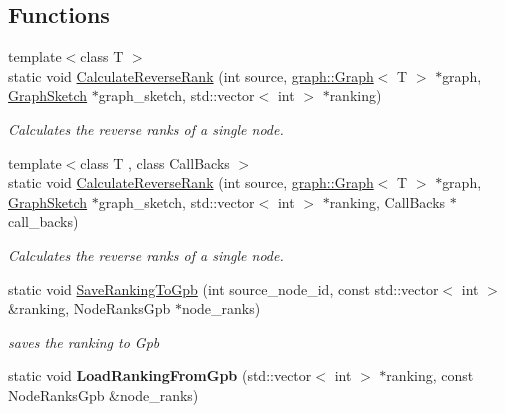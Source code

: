 \subsection*{Functions}
\begin{DoxyCompactItemize}
\item 
{\footnotesize template$<$class T $>$ }\\static void \hyperlink{namespaceall__distance__sketch_a025f777de5a9df1594dd306f9037f385}{Calculate\+Reverse\+Rank} (int source, \hyperlink{classall__distance__sketch_1_1graph_1_1Graph}{graph\+::\+Graph}$<$ T $>$ $\ast$graph, \hyperlink{classall__distance__sketch_1_1GraphSketch}{Graph\+Sketch} $\ast$graph\+\_\+sketch, std\+::vector$<$ int $>$ $\ast$ranking)
\begin{DoxyCompactList}\small\item\em Calculates the reverse ranks of a single node. \end{DoxyCompactList}\item 
{\footnotesize template$<$class T , class Call\+Backs $>$ }\\static void \hyperlink{namespaceall__distance__sketch_acd397719d04e49914cac475154a15735}{Calculate\+Reverse\+Rank} (int source, \hyperlink{classall__distance__sketch_1_1graph_1_1Graph}{graph\+::\+Graph}$<$ T $>$ $\ast$graph, \hyperlink{classall__distance__sketch_1_1GraphSketch}{Graph\+Sketch} $\ast$graph\+\_\+sketch, std\+::vector$<$ int $>$ $\ast$ranking, Call\+Backs $\ast$call\+\_\+backs)
\begin{DoxyCompactList}\small\item\em Calculates the reverse ranks of a single node. \end{DoxyCompactList}\item 
\hypertarget{namespaceall__distance__sketch_a8d0d2d80289713f668cdf53e48421114}{}static void \hyperlink{namespaceall__distance__sketch_a8d0d2d80289713f668cdf53e48421114}{Save\+Ranking\+To\+Gpb} (int source\+\_\+node\+\_\+id, const std\+::vector$<$ int $>$ \&ranking, Node\+Ranks\+Gpb $\ast$node\+\_\+ranks)\label{namespaceall__distance__sketch_a8d0d2d80289713f668cdf53e48421114}

\begin{DoxyCompactList}\small\item\em saves the ranking to Gpb \end{DoxyCompactList}\item 
\hypertarget{namespaceall__distance__sketch_a6a770d6cb037c174320a48bbb1ef5b56}{}static void {\bfseries Load\+Ranking\+From\+Gpb} (std\+::vector$<$ int $>$ $\ast$ranking, const Node\+Ranks\+Gpb \&node\+\_\+ranks)\label{namespaceall__distance__sketch_a6a770d6cb037c174320a48bbb1ef5b56}


\end{DoxyCompactItemize}
